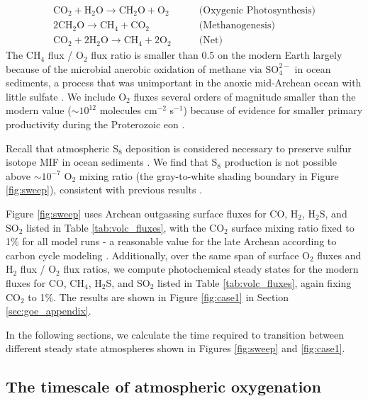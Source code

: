 \begin{equation}
\begin{aligned}
    \mathrm{CO_2} + \mathrm{H_2O} \rightarrow \mathrm{CH_2O} + \mathrm{O_2} \quad\quad &\text{(Oxygenic Photosynthesis)} \\
    2 \mathrm{CH_2O} \rightarrow \mathrm{CH_4} + \mathrm{CO_2} \quad\quad &\text{(Methanogenesis)} \\
    \mathrm{CO_2} + 2\mathrm{H_2O} \rightarrow \mathrm{CH_4} + 2 \mathrm{O_2} \quad\quad &\text{(Net)}
\end{aligned}
\end{equation}
The CH$_4$ flux / O$_2$ flux ratio is smaller than 0.5 on the modern Earth largely because of the microbial anerobic oxidation of methane via $\mathrm{SO_4^{2-}}$ in ocean sediments, a process that was unimportant in the anoxic mid-Archean ocean with little sulfate \citep{Canfield_2000,Catling_2007,Olson_2016}. We include O$_2$ fluxes several orders of magnitude smaller than the modern value ($\sim 10^{12}$ molecules cm$^{-2}$ s$^{-1}$) because of evidence for smaller primary productivity during the Proterozoic eon \citep{Laakso_2019,Kipp_2021}.

Recall that atmospheric S$_8$ deposition is considered necessary to preserve sulfur isotope MIF in ocean sediments \citep{Pavlov_2002}. We find that S$_8$ production is not possible above $\sim10^{-7}$ O$_2$ mixing ratio (the gray-to-white shading boundary in Figure \ref{fig:sweep}), consistent with previous results \citep{Zahnle_2006}.

Figure \ref{fig:sweep} uses Archean outgassing surface fluxes for CO, H$_2$, H$_2$S, and SO$_2$ listed in Table \ref{tab:volc_fluxes}, with the CO$_2$ surface mixing ratio fixed to 1\% for all model runs - a reasonable value for the late Archean according to carbon cycle modeling \citep{KrissansenTotton_2018_carbon}. Additionally, over the same span of surface O$_2$ fluxes and H$_2$ flux / O$_2$ flux ratios, we compute photochemical steady states for the modern fluxes for CO, CH$_4$, H$_2$S, and SO$_2$ listed in Table \ref{tab:volc_fluxes}, again fixing CO$_2$ to 1\%. The results are shown in Figure \ref{fig:case1} in Section \ref{sec:goe_appendix}.

In the following sections, we calculate the time required to transition between different steady state atmospheres shown in Figures \ref{fig:sweep} and \ref{fig:case1}.

\subsection{The timescale of atmospheric oxygenation} \label{sec:oxygenation}

